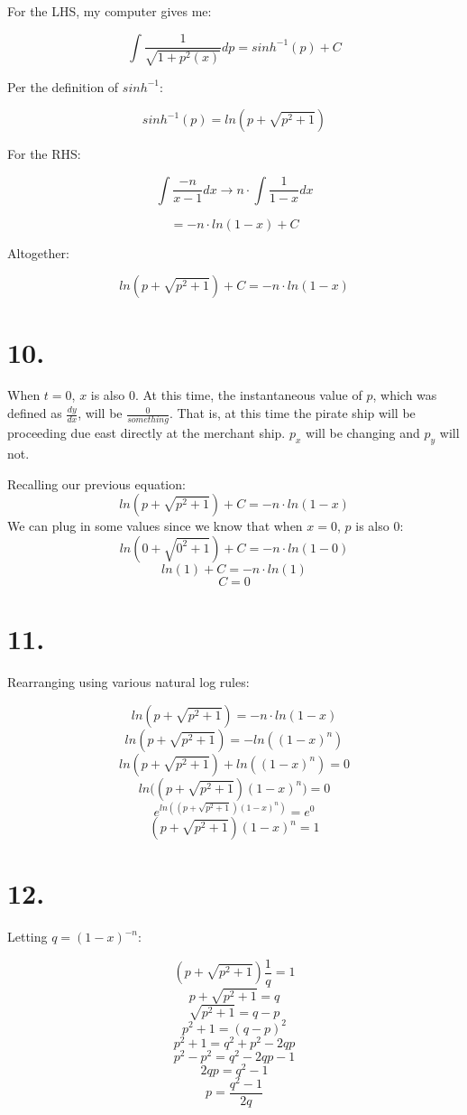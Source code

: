 \documentclass[11pt]{report}
\begin{document}
For the LHS, my computer gives me:

$$
\int \frac{1}{\sqrt{1 + p^2(x)}} dp
=
sinh^{-1}(p) + C
$$

Per the definition of $sinh^{-1}$:

$$
sinh^{-1}(p) = ln(p + \sqrt{p^2 + 1})
$$

For the RHS:

$$
\int \frac{-n}{x-1} dx
\rightarrow
n \cdot \int \frac{1}{1-x} dx
$$

$$ = -n \cdot ln(1-x) + C $$

Altogether:

$$
ln(p + \sqrt{p^2 + 1}) + C
=
-n \cdot ln(1-x)
$$

\section*{10.}

When $t=0$, $x$ is also $0$. At this time, the instantaneous value of $p$, which was
defined as $\frac{dy}{dx}$, will be $\frac{0}{something}$. That is, at this time
the pirate ship will be proceeding due east directly at the merchant ship.
$p_x$ will be changing and $p_y$ will not.

Recalling our previous equation:
$$
ln(p + \sqrt{p^2 + 1}) + C
=
-n \cdot ln(1-x)
$$
We can plug in some values since we know that when $x=0$, $p$ is also $0$:
$$
ln(0 + \sqrt{0^2 + 1}) + C
=
-n \cdot ln(1-0)
$$
$$ ln(1) + C = -n \cdot ln(1) $$
$$ C = 0 $$

\section*{11.}

Rearranging using various natural log rules:

$$ ln(p + \sqrt{p^2 + 1}) = -n \cdot ln(1-x) $$
$$ ln(p + \sqrt{p^2 + 1}) = -ln((1-x)^n) $$
$$ ln(p + \sqrt{p^2 + 1}) + ln((1-x)^n) = 0 $$
$$ ln\Big((p + \sqrt{p^2 + 1}) (1-x)^n \Big) = 0 $$
$$ e^{ln((p + \sqrt{p^2 + 1}) (1-x)^n )} = e^0 $$
$$(p + \sqrt{p^2 + 1}) (1-x)^n = 1$$

\section*{12.}

Letting $q=(1-x)^{-n}$:

$$(p + \sqrt{p^2 + 1}) \frac{1}{q} = 1$$
$$p + \sqrt{p^2 + 1} = q$$
$$\sqrt{p^2 + 1} = q - p$$
$$p^2 + 1 = (q - p)^2$$
$$p^2 + 1 = q^2 + p^2 - 2qp$$
$$p^2 - p^2 = q^2 - 2qp - 1$$
$$2qp = q^2 - 1$$
$$p = \frac{q^2 - 1}{2q}$$
\end{document}
